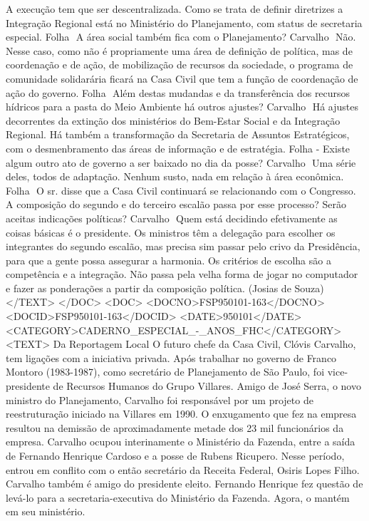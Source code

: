 A execução tem que ser descentralizada. Como se trata de definir diretrizes a Integração Regional está no Ministério do Planejamento, com status de secretaria especial.
Folha  A área social também fica com o Planejamento?
Carvalho  Não. Nesse caso, como não é propriamente uma área de definição de política, mas de coordenação e de ação, de mobilização de recursos da sociedade, o programa de comunidade solidarária ficará na Casa Civil que tem a função de coordenação de ação do governo.
Folha  Além destas mudandas e da transferência dos recursos hídricos para a pasta do Meio Ambiente há outros ajustes?
Carvalho  Há ajustes decorrentes da extinção dos ministérios do Bem-Estar Social e da Integração Regional. Há também a transformação da Secretaria de Assuntos Estratégicos, com o desmenbramento das áreas de informação e de estratégia.
Folha - Existe algum outro ato de governo a ser baixado no dia da posse?
Carvalho  Uma série deles, todos de adaptação. Nenhum susto, nada em relação à área econômica.
Folha  O sr. disse que a Casa Civil continuará se relacionando com o Congresso. A composição do segundo e do terceiro escalão passa por esse processo? Serão aceitas indicações políticas?
Carvalho  Quem está decidindo efetivamente as coisas básicas é o presidente. Os ministros têm a delegação para escolher os integrantes do segundo escalão, mas precisa sim passar pelo crivo da Presidência, para que a gente possa assegurar a harmonia. Os critérios de escolha são a competência e a integração. Não passa pela velha forma de jogar no computador e fazer as ponderações a partir da composição política.
(Josias de Souza)
</TEXT>
</DOC>
<DOC>
<DOCNO>FSP950101-163</DOCNO>
<DOCID>FSP950101-163</DOCID>
<DATE>950101</DATE>
<CATEGORY>CADERNO_ESPECIAL_-_ANOS_FHC</CATEGORY>
<TEXT>
Da Reportagem Local 
O futuro chefe da Casa Civil, Clóvis Carvalho, tem ligações com a iniciativa privada. Após trabalhar no governo de Franco Montoro (1983-1987), como secretário de Planejamento de São Paulo, foi vice-presidente de Recursos Humanos do Grupo Villares.
Amigo de José Serra, o novo ministro do Planejamento, Carvalho foi responsável por um projeto de reestruturação iniciado na Villares em 1990. O enxugamento que fez na empresa resultou na demissão de aproximadamente metade dos 23 mil funcionários da empresa.
Carvalho ocupou interinamente o Ministério da Fazenda, entre a saída de Fernando Henrique Cardoso e a posse de Rubens Ricupero. Nesse período, entrou em conflito com o então secretário da Receita Federal, Osiris Lopes Filho.
Carvalho também é amigo do presidente eleito. Fernando Henrique fez questão de levá-lo para a secretaria-executiva do Ministério da Fazenda. Agora, o mantém em seu ministério.
